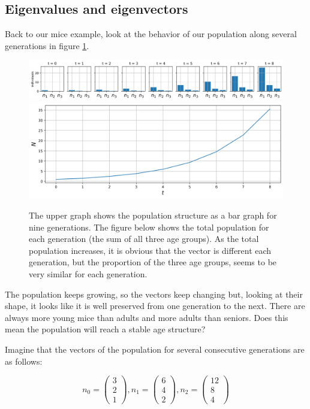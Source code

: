 \documentclass[12pt]{article}
\begin{document}
\subsection{Eigenvalues and eigenvectors}

Back to our mice example, look at the behavior of our population along several generations in figure \ref{fig:Lpop}.

\begin{figure}
	\begin{center}
		\includegraphics[width=\textwidth]{pop_evol}
		\includegraphics[width=\textwidth]{tot_pop_evol}		
	\end{center}
	\caption{The upper graph shows the population structure as a bar graph for nine generations. The figure below shows the total population for each generation (the sum of all three age groups). As the total population increases, it is obvious that the vector is different each generation, but the proportion of the three age groups, seems to be very similar for each generation.}
	\label{fig:Lpop}
\end{figure}

The population keeps growing, so the vectors keep changing but, looking at their shape, it looks like it is well preserved from one generation to the next. There are always more young mice than adults and more adults than seniors. Does this mean the population will reach a stable age structure?

Imagine that the vectors of the population for several consecutive generations are as follows:

\begin{equation}
	n_0 = \begin{pmatrix} 3\\ 2 \\ 1\end{pmatrix}, 
	n_1 = \begin{pmatrix} 6\\ 4 \\ 2\end{pmatrix}, 
	n_2 = \begin{pmatrix} 12\\ 8 \\ 4\end{pmatrix}
\end{equation}
\end{document}
